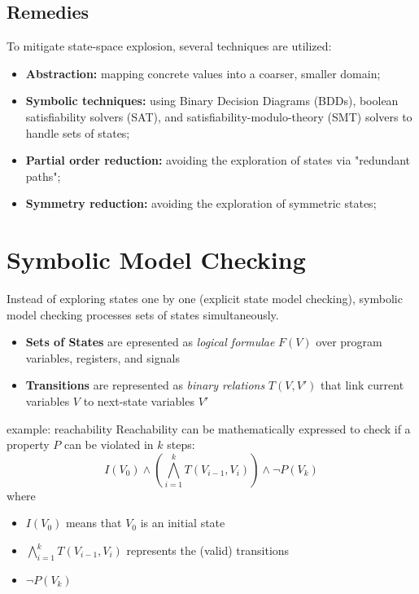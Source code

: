 \documentclass[a4paper, 11pt]{report}
\begin{document}
\subsection{Remedies}
To mitigate state-space explosion, several techniques are utilized:
\begin{itemize}
    \item \textbf{Abstraction:} mapping concrete values into a coarser, smaller domain;
    \item \textbf{Symbolic techniques:} using Binary Decision Diagrams (BDDs), boolean satisfiability solvers (SAT), and satisfiability-modulo-theory (SMT) solvers to handle sets of states;
    \item \textbf{Partial order reduction:} avoiding the exploration of states via "redundant paths";
    \item \textbf{Symmetry reduction:} avoiding the exploration of symmetric states;
\end{itemize}

\section{Symbolic Model Checking}
Instead of exploring states one by one (explicit state model checking), symbolic model checking processes sets of states simultaneously.

\begin{itemize}
    \item \textbf{Sets of States} are epresented as \textit{logical formulae} $F(V)$ over program variables, registers, and signals
    \item \textbf{Transitions} are represented as \textit{binary relations} $T(V, V')$ that link current variables $V$ to next-state variables $V'$
\end{itemize}

\begin{gframe}{example: reachability}
Reachability can be mathematically expressed to check if a property $P$ can be violated in $k$ steps: 
$$I(V_0) \wedge \left(\bigwedge_{i=1}^k T(V_{i-1}, V_i)\right) \wedge \neg P(V_k)$$
where
\begin{itemize}
    \item $I(V_{0})$ means that $V_{0}$ is an initial state
    \item $\bigwedge_{i=1}^k T(V_{i-1}, V_i)$ represents the (valid) transitions
    \item $\neg P(V_k)$
\end{itemize}
\end{gframe}
\end{document}
